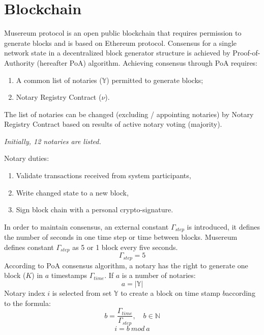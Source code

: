 \documentclass[12pt]{report}
\newcommand{\hlc}[1]{\colorbox{yellow!25}{#1}}
\begin{document}
\section{Blockchain}
\label{tech-blockchain}
\begin{multicols}{2}
Musereum protocol is an open public blockchain that requires permission to generate blocks and is based on Ethereum protocol. Consensus for a single network state in a decentralized block generator structure is achieved by Proof-of-Authority (hereafter PoA) algorithm. Achieving consensus through PoA requires:
\begin{enumerate}
\item A common list of notaries ($\mathbb{Y}$) permitted to generate blocks;
\item Notary Registry Contract ($\nu$).
\end{enumerate}
The list of notaries can be changed (excluding / appointing notaries) by Notary Registry Contract based on results of active notary voting (majority).

\textit{Initially, 12 notaries are listed.}

Notary \hlc{duties}: 
\begin{enumerate}
\item Validate transactions received from system participants,
\item \hlc{Write changed state to a new block},
\item \hlc{Sign block chain} with a personal crypto-signature.
\end{enumerate}

In order to maintain consensus, an external constant $\Gamma_{step}$ is introduced, it defines the number of seconds in one time step or time between blocks. Musereum defines constant $\Gamma_{step}$ as 5 or 1 block every five seconds.
\begin{equation}
\Gamma_{step} = 5
\end{equation}
According to PoA consensus algorithm, a notary has the right to generate one block ($K$) in $a$ \hlc{timestamps} $\Gamma_{time}$. If $a$ is a number of notaries:
\begin{equation}
a = |\mathbb{Y}|
\end{equation}
Notary index $i$ is selected from set $\mathbb{Y}$ to create a block on time stamp $b$according to the formula: 
\begin{equation}
b = \frac{\Gamma_{time}}{\Gamma_{step}},  \quad b \in \mathbb{N} 
\end{equation}
\begin{equation}
i = b \ mod \ a
\end{equation}
\end{multicols}
\end{document}
